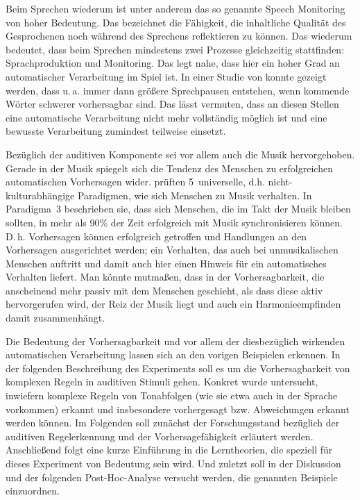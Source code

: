 \documentclass[doc,a4paper,12pt]{apa6}
\begin{document}
Beim Sprechen wiederum ist unter anderem das so genannte Speech Monitoring \parencites{levelt1983monitoring}{postma2000detection} von hoher Bedeutung. Das bezeichnet die Fähigkeit, die inhaltliche Qualität des Gesprochenen noch während des Sprechens reflektieren zu können. Das wiederum bedeutet, dass beim Sprechen mindestens zwei Prozesse gleichzeitig stattfinden: Sprachproduktion und Monitoring. Das legt nahe, dass hier ein hoher Grad an automatischer Verarbeitung im Spiel ist. In einer Studie von \textcite{goldman1958speech} konnte gezeigt werden, dass u.\,a. immer dann größere Sprechpausen entstehen, wenn kommende Wörter schwerer vorhersagbar sind. Das lässt vermuten, dass an diesen Stellen eine automatische Verarbeitung nicht mehr vollständig möglich ist und eine bewusste Verarbeitung zumindest teilweise einsetzt.

Bezüglich der auditiven Komponente sei vor allem auch die Musik hervorgehoben. Gerade in der Musik spiegelt sich die Tendenz des Menschen zu erfolgreichen automatischen Vorhersagen wider. \textcite{drake2001quest} prüften 5~universelle, d.h. nicht-kulturabhängige Paradigmen, wie sich Menschen zu Musik verhalten. In Paradigma~3 beschrieben sie, dass sich Menschen, die im Takt der Musik bleiben sollten, in mehr als 90\% der Zeit erfolgreich mit Musik synchronisieren können. D.\,h. Vorhersagen können erfolgreich getroffen und Handlungen an den Vorhersagen ausgerichtet werden; ein Verhalten, das auch bei unmusikalischen Menschen auftritt und damit auch hier einen Hinweis für ein automatisches Verhalten liefert. Man könnte mutmaßen, dass in der Vorhersagbarkeit, die anscheinend mehr passiv mit dem Menschen geschieht, als dass diese aktiv hervorgerufen wird, der Reiz der Musik liegt und auch ein Harmonieempfinden damit zusammenhängt.

Die Bedeutung der Vorhersagbarkeit und vor allem der diesbezüglich wirkenden automatischen Verarbeitung lassen sich an den vorigen Beispielen erkennen. In der folgenden Beschreibung des Experiments soll es um die Vorhersagbarkeit von komplexen Regeln in auditiven Stimuli gehen. Konkret wurde untersucht, inwiefern komplexe Regeln von Tonabfolgen (wie sie etwa auch in der Sprache vorkommen) erkannt und insbesondere vorhergesagt bzw. Abweichungen erkannt werden können. Im Folgenden soll zunächst der Forschungsstand bezüglich der auditiven Regelerkennung und der Vorhersagefähigkeit erläutert werden. Anschließend folgt eine kurze Einführung in die Lerntheorien, die speziell für dieses Experiment von Bedeutung sein wird. Und zuletzt soll in der Diskussion und der folgenden Post-Hoc-Analyse versucht werden, die genannten Beispiele einzuordnen.
\end{document}
